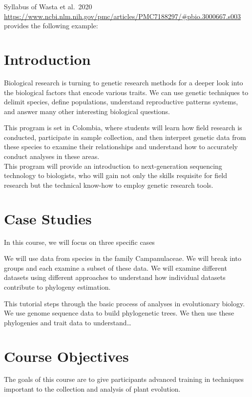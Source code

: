 \documentclass[
]{book}
\begin{document}
Syllabus of Wasta et al.~2020 \url{https://www.ncbi.nlm.nih.gov/pmc/articles/PMC7188297/\#pbio.3000667.s003} provides the following example:

\hypertarget{introduction}{%
\section{Introduction}\label{introduction}}

Biological research is turning to genetic research methods for a deeper look into the biological factors that encode various traits.
We can use genetic techniques to delimit species, define populations, understand reproductive patterns systems, and answer many other interesting biological questions.

This program is set in Colombia, where students will learn how field research is conducted, participate in sample collection, and then interpret genetic data from these species to examine their relationships and understand how to accurately conduct analyses in these areas.\\
This program will provide an introduction to next-generation sequencing technology to biologists, who will gain not only the skills requisite for field research but the technical know-how to employ genetic research tools.

\hypertarget{case-studies}{%
\section{Case Studies}\label{case-studies}}

In this course, we will focus on three specific cases

We will use data from species in the family Campanulaceae.
We will break into groups and each examine a subset of these data.
We will examine different datasets using different approaches to understand how individual datasets contribute to phylogeny estimation.

This tutorial steps through the basic process of analyses in evolutionary biology.
We use genome sequence data to build phylogenetic trees.
We then use these phylogenies and trait data to understand\ldots{}

\hypertarget{course-objectives}{%
\section{Course Objectives}\label{course-objectives}}

The goals of this course are to give participants advanced training in techniques important to the collection and analysis of plant evolution.
\end{document}
